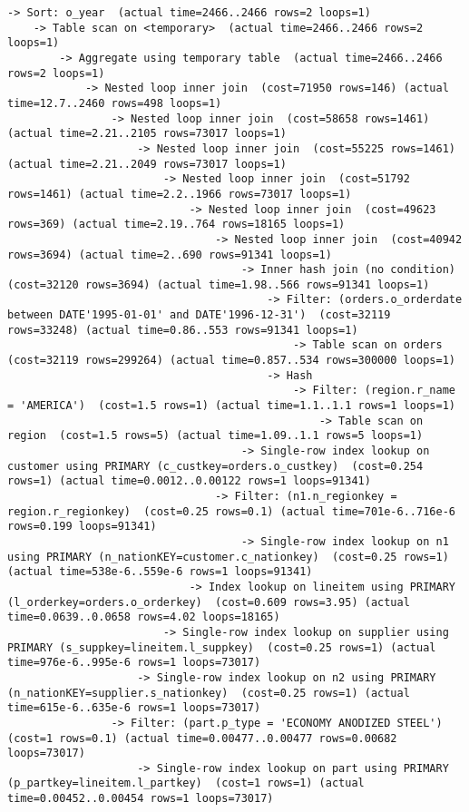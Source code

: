 \documentclass{article}
\begin{document}
\begin{lstlisting}
-> Sort: o_year  (actual time=2466..2466 rows=2 loops=1)
    -> Table scan on <temporary>  (actual time=2466..2466 rows=2 loops=1)
        -> Aggregate using temporary table  (actual time=2466..2466 rows=2 loops=1)
            -> Nested loop inner join  (cost=71950 rows=146) (actual time=12.7..2460 rows=498 loops=1)
                -> Nested loop inner join  (cost=58658 rows=1461) (actual time=2.21..2105 rows=73017 loops=1)
                    -> Nested loop inner join  (cost=55225 rows=1461) (actual time=2.21..2049 rows=73017 loops=1)
                        -> Nested loop inner join  (cost=51792 rows=1461) (actual time=2.2..1966 rows=73017 loops=1)
                            -> Nested loop inner join  (cost=49623 rows=369) (actual time=2.19..764 rows=18165 loops=1)
                                -> Nested loop inner join  (cost=40942 rows=3694) (actual time=2..690 rows=91341 loops=1)
                                    -> Inner hash join (no condition)  (cost=32120 rows=3694) (actual time=1.98..566 rows=91341 loops=1)
                                        -> Filter: (orders.o_orderdate between DATE'1995-01-01' and DATE'1996-12-31')  (cost=32119 rows=33248) (actual time=0.86..553 rows=91341 loops=1)
                                            -> Table scan on orders  (cost=32119 rows=299264) (actual time=0.857..534 rows=300000 loops=1)
                                        -> Hash
                                            -> Filter: (region.r_name = 'AMERICA')  (cost=1.5 rows=1) (actual time=1.1..1.1 rows=1 loops=1)
                                                -> Table scan on region  (cost=1.5 rows=5) (actual time=1.09..1.1 rows=5 loops=1)
                                    -> Single-row index lookup on customer using PRIMARY (c_custkey=orders.o_custkey)  (cost=0.254 rows=1) (actual time=0.0012..0.00122 rows=1 loops=91341)
                                -> Filter: (n1.n_regionkey = region.r_regionkey)  (cost=0.25 rows=0.1) (actual time=701e-6..716e-6 rows=0.199 loops=91341)
                                    -> Single-row index lookup on n1 using PRIMARY (n_nationKEY=customer.c_nationkey)  (cost=0.25 rows=1) (actual time=538e-6..559e-6 rows=1 loops=91341)
                            -> Index lookup on lineitem using PRIMARY (l_orderkey=orders.o_orderkey)  (cost=0.609 rows=3.95) (actual time=0.0639..0.0658 rows=4.02 loops=18165)
                        -> Single-row index lookup on supplier using PRIMARY (s_suppkey=lineitem.l_suppkey)  (cost=0.25 rows=1) (actual time=976e-6..995e-6 rows=1 loops=73017)
                    -> Single-row index lookup on n2 using PRIMARY (n_nationKEY=supplier.s_nationkey)  (cost=0.25 rows=1) (actual time=615e-6..635e-6 rows=1 loops=73017)
                -> Filter: (part.p_type = 'ECONOMY ANODIZED STEEL')  (cost=1 rows=0.1) (actual time=0.00477..0.00477 rows=0.00682 loops=73017)
                    -> Single-row index lookup on part using PRIMARY (p_partkey=lineitem.l_partkey)  (cost=1 rows=1) (actual time=0.00452..0.00454 rows=1 loops=73017)

\end{lstlisting}
\end{document}
